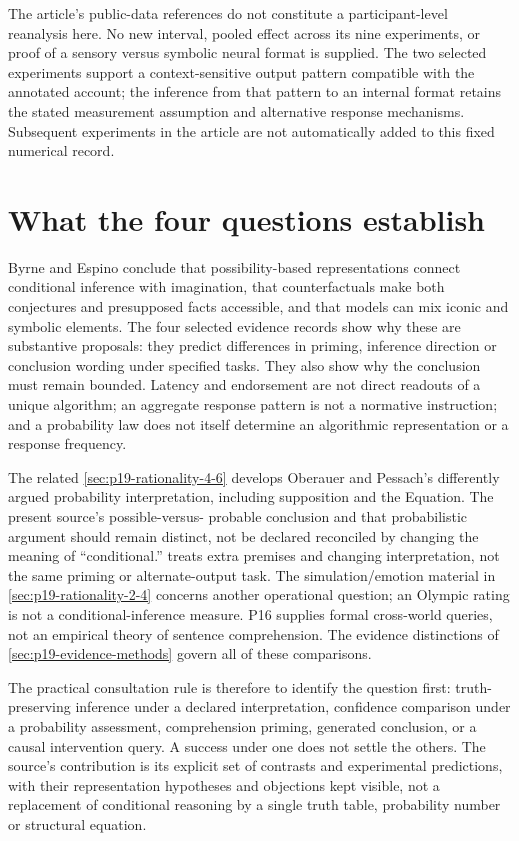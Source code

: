 The article's public-data references do not constitute a participant-level
reanalysis here. No new interval, pooled effect across its nine experiments,
or proof of a sensory versus symbolic neural format is supplied. The two
selected experiments support a context-sensitive output pattern compatible
with the annotated account; the inference from that pattern to an internal
format retains the stated measurement assumption and alternative response
mechanisms. Subsequent experiments in the article are not automatically
added to this fixed numerical record.

\section{What the four questions establish}

Byrne and Espino conclude that possibility-based representations connect
conditional inference with imagination, that counterfactuals make both
conjectures and presupposed facts accessible, and that models can mix
iconic and symbolic elements. The four selected evidence records show
why these are substantive proposals: they predict differences in priming,
inference direction or conclusion wording under specified tasks. They
also show why the conclusion must remain bounded. Latency and endorsement
are not direct readouts of a unique algorithm; an aggregate response
pattern is not a normative instruction; and a probability law does not
itself determine an algorithmic representation or a response frequency.

The related \cref{sec:p19-rationality-4-6} develops Oberauer and
Pessach's differently argued probability interpretation, including
supposition and the Equation. The present source's possible-versus-
probable conclusion and that probabilistic argument should remain
distinct, not be declared reconciled by changing the meaning of
``conditional.''  treats extra premises
and changing interpretation, not the same priming or alternate-output
task. The simulation/emotion material in
\cref{sec:p19-rationality-2-4} concerns another operational question;
an Olympic rating is not a conditional-inference measure. P16 supplies
formal cross-world queries, not an empirical theory of sentence
comprehension. The evidence distinctions of
\cref{sec:p19-evidence-methods} govern all of these comparisons.

The practical consultation rule is therefore to identify the question
first: truth-preserving inference under a declared interpretation,
confidence comparison under a probability assessment, comprehension
priming, generated conclusion, or a causal intervention query. A success
under one does not settle the others. The source's contribution is its
explicit set of contrasts and experimental predictions, with their
representation hypotheses and objections kept visible, not a replacement
of conditional reasoning by a single truth table, probability number
or structural equation.
